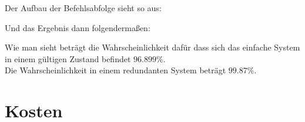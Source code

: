 \documentclass[10pt,a4paper]{article}
\begin{document}
Der Aufbau der Befehlsabfolge sieht so aus:

\newpage
Und das Ergebnis dann folgendermaßen:

Wie man sieht beträgt die Wahrscheinlichkeit dafür dass sich das einfache System in einem gültigen Zustand befindet $96.899\%$. \\
Die Wahrscheinlichkeit in einem redundanten System beträgt $99.87\%$.
\section{Kosten}
\end{document}
